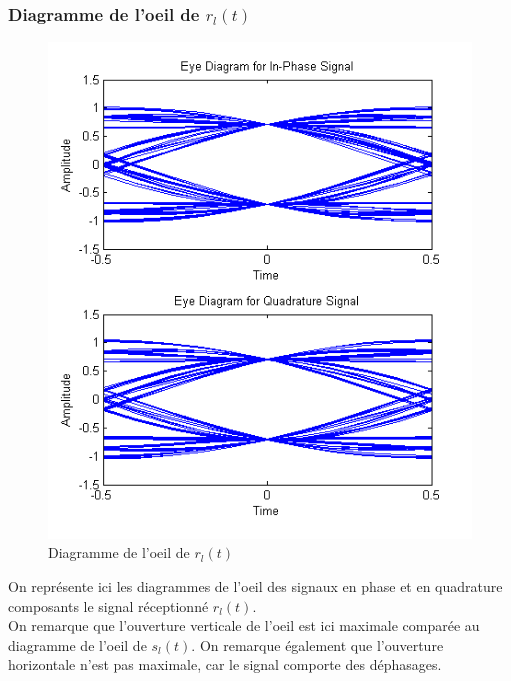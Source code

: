 \documentclass[11pt]{article}
\begin{document}
		\subsubsection{Diagramme de l'oeil de $r_l(t)$}
			\begin{figure}[!ht]
				\centering
				\includegraphics[scale=0.5]{images/Q425.png}
				\caption{Diagramme de l'oeil de $r_l(t)$}
				\label{Q425}
			\end{figure}
		On représente ici les diagrammes de l'oeil des signaux en phase et en quadrature composants le signal réceptionné $r_l(t)$.\\
			On remarque que l'ouverture verticale de l'oeil est ici maximale comparée au diagramme de l'oeil de $s_l(t)$. On remarque également que l'ouverture horizontale n'est pas maximale, car le signal comporte des déphasages.
			
\end{document}
